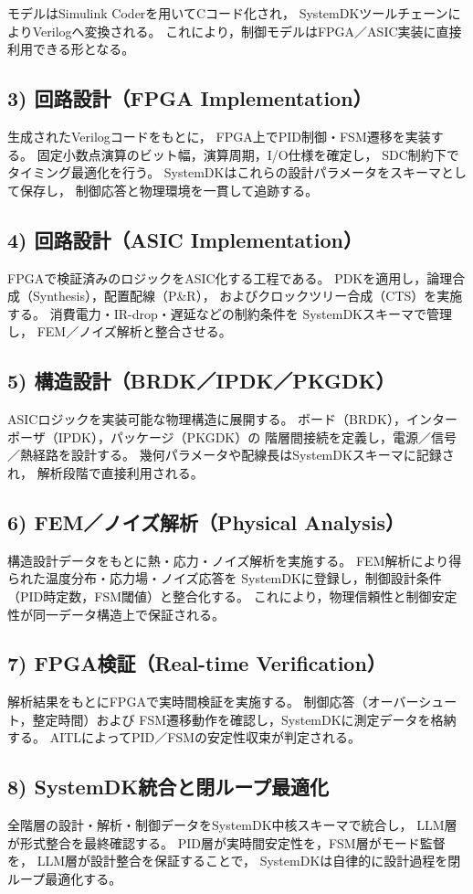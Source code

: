 モデルはSimulink Coderを用いてCコード化され，
SystemDKツールチェーンによりVerilogへ変換される。
これにより，制御モデルはFPGA／ASIC実装に直接利用できる形となる。

\subsection{3) 回路設計（FPGA Implementation）}
生成されたVerilogコードをもとに，
FPGA上でPID制御・FSM遷移を実装する。
固定小数点演算のビット幅，演算周期，I/O仕様を確定し，
SDC制約下でタイミング最適化を行う。
SystemDKはこれらの設計パラメータをスキーマとして保存し，
制御応答と物理環境を一貫して追跡する。

\subsection{4) 回路設計（ASIC Implementation）}
FPGAで検証済みのロジックをASIC化する工程である。
PDKを適用し，論理合成（Synthesis），配置配線（P&R），
およびクロックツリー合成（CTS）を実施する。
消費電力・IR-drop・遅延などの制約条件を
SystemDKスキーマで管理し，
FEM／ノイズ解析と整合させる。

\subsection{5) 構造設計（BRDK／IPDK／PKGDK）}
ASICロジックを実装可能な物理構造に展開する。
ボード（BRDK），インターポーザ（IPDK），パッケージ（PKGDK）の
階層間接続を定義し，電源／信号／熱経路を設計する。
幾何パラメータや配線長はSystemDKスキーマに記録され，
解析段階で直接利用される。

\subsection{6) FEM／ノイズ解析（Physical Analysis）}
構造設計データをもとに熱・応力・ノイズ解析を実施する。
FEM解析により得られた温度分布・応力場・ノイズ応答を
SystemDKに登録し，制御設計条件（PID時定数，FSM閾値）と整合化する。
これにより，物理信頼性と制御安定性が同一データ構造上で保証される。

\subsection{7) FPGA検証（Real-time Verification）}
解析結果をもとにFPGAで実時間検証を実施する。
制御応答（オーバーシュート，整定時間）および
FSM遷移動作を確認し，SystemDKに測定データを格納する。
AITLによってPID／FSMの安定性収束が判定される。

\subsection{8) SystemDK統合と閉ループ最適化}
全階層の設計・解析・制御データをSystemDK中核スキーマで統合し，
LLM層が形式整合を最終確認する。
PID層が実時間安定性を，FSM層がモード監督を，
LLM層が設計整合を保証することで，
SystemDKは自律的に設計過程を閉ループ最適化する。
